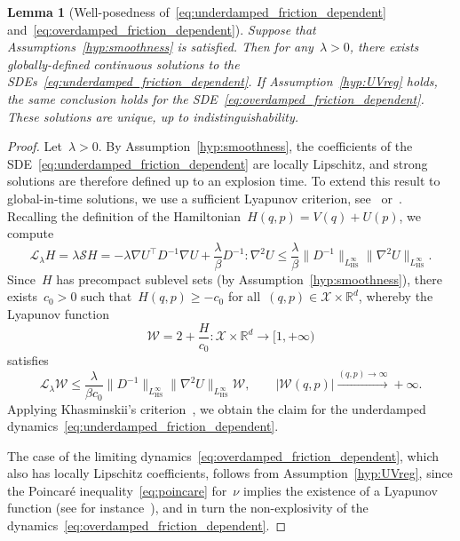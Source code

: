 \documentclass[10pt]{article}
\newcommand{\cL}{\mathcal{L}}
\newcommand{\R}{\mathbb{R}}
\newcommand{\cX}{\mathcal{X}}
\newcommand{\cLou}{\mathcal S}
\newcommand{\1}{\mathbbm 1}
\newcommand{\cW}{\mathcal{W}}
\newtheorem{lemma}{Lemma}
\begin{document}
\begin{lemma}[Well-posedness of~\eqref{eq:underdamped_friction_dependent} and~\eqref{eq:overdamped_friction_dependent}]
    \label{lemma:wp}
    Suppose that Assumptions~\ref{hyp:smoothness} is satisfied. Then for any~$\lambda>0$, there exists globally-defined continuous solutions to the SDEs~\eqref{eq:underdamped_friction_dependent}. If Assumption~\ref{hyp:UVreg} holds, the same conclusion holds for the SDE~\eqref{eq:overdamped_friction_dependent}. These solutions are unique, up to indistinguishability.
\end{lemma}
\begin{proof}
    Let~$\lambda>0$. By Assumption~\ref{hyp:smoothness}, the coefficients of the SDE~\eqref{eq:underdamped_friction_dependent} are locally Lipschitz, and strong solutions are therefore defined up to an explosion time. To extend this result to global-in-time solutions, we use a sufficient Lyapunov criterion, see~\cite[Theorem 3.5]{K12} or~\cite[Theorem 5.9]{RB06}.
    Recalling the definition of the Hamiltonian~$H(q,p)=V(q)+U(p)$, we compute
    \begin{equation}
       \cL_\lambda H = \lambda \cLou H = - \lambda \nabla U^\top D^{-1}\nabla U + \frac{\lambda}{\beta}D^{-1}:\nabla^2 U \leq \frac{\lambda}{\beta}\|D^{-1}\|_{L^\infty_{\mathrm{HS}}}\|\nabla^2 U\|_{L^\infty_{\mathrm{HS}}}.
    \end{equation}
    Since~$H$ has precompact sublevel sets (by Assumption~\ref{hyp:smoothness}), there exists~$c_0>0$ such that~$H(q,p)\geq - c_0 $ for all~$(q,p)\in \cX\times\R^d$, whereby the Lyapunov function
    \begin{equation}
        \cW = 2+\frac{H}{c_0} : \cX\times\R^d \to [1,+\infty)
    \end{equation}
    satisfies
    \begin{equation}
        \cL_\lambda \cW \leq \frac{\lambda}{\beta c_0}\|D^{-1}\|_{L^\infty_{\mathrm{HS}}}\|\nabla^2 U\|_{L^\infty_{\mathrm{HS}}}\cW,\qquad |\cW(q,p)|\xrightarrow{(q,p)\to \infty} + \infty.
    \end{equation}
    Applying Khasminskii's criterion~\cite[Theorem 3.5]{K12}, we obtain the claim for the underdamped dynamics~\eqref{eq:underdamped_friction_dependent}.
    
    The case of the limiting dynamics~\eqref{eq:overdamped_friction_dependent}, which also has locally Lipschitz coefficients, follows from Assumption~\ref{hyp:UVreg}, since the Poincar\'e inequality~\eqref{eq:poincare} for~$\nu$ implies the existence of a Lyapunov function (see for instance~\cite[Theorem 2.3]{CGZ13}), and in turn the non-explosivity of the dynamics~\eqref{eq:overdamped_friction_dependent}.
\end{proof}
\end{document}
